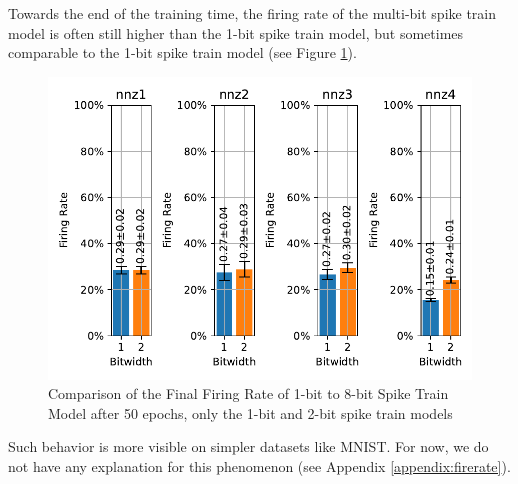     Towards the end of the training time, the firing rate of the multi-bit spike train model is often still higher than the 1-bit spike train model, but sometimes comparable to the 1-bit spike train model (see Figure \ref{fig:final_firing_rate}). 
    \begin{figure}[!htpb]
        \centering
        \includegraphics[width=\textwidth]{../firerate/FashionMNIST/plots/fashionmnist_final_firerate.pdf}
        \caption{Comparison of the Final Firing Rate of 1-bit to 8-bit Spike Train Model after 50 epochs, only the 1-bit and 2-bit spike train models}
        \label{fig:final_firing_rate}
    \end{figure}

    Such behavior is more visible on simpler datasets like MNIST. For now, we do not have any explanation for this phenomenon (see Appendix \ref{appendix:firerate}).

